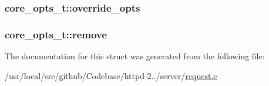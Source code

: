 \subsubsection[{\texorpdfstring{override\+\_\+opts}{override_opts}}]{ core\+\_\+opts\+\_\+t\+::override\+\_\+opts}\hypertarget{structcore__opts__t_ae88ae92abb0c6f19be537d97dbda1e56}{}\label{structcore__opts__t_ae88ae92abb0c6f19be537d97dbda1e56}
\subsubsection[{\texorpdfstring{remove}{remove}}]{ core\+\_\+opts\+\_\+t\+::remove}\hypertarget{structcore__opts__t_a52f40c88c047ebe55bce4519e79e478c}{}\label{structcore__opts__t_a52f40c88c047ebe55bce4519e79e478c}


The documentation for this struct was generated from the following file\+:\begin{DoxyCompactItemize}
\item 
/usr/local/src/github/\+Codebase/httpd-\/2../server/\hyperlink{request_8c}{request.\+c}\end{DoxyCompactItemize}
